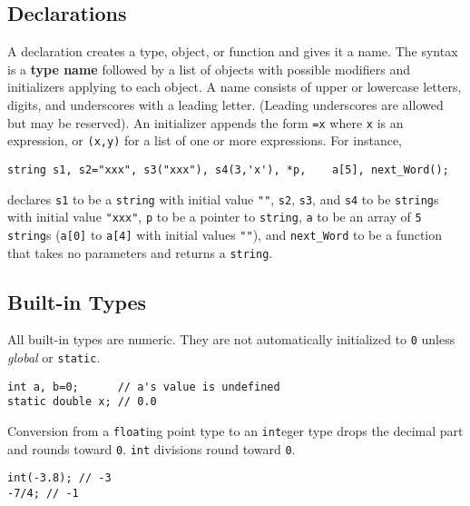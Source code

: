 	
	\subsection{Declarations} %
		A declaration creates a type, object, or function and gives it a name. The syntax is a \textbf{type name} followed by a list of objects with possible modifiers and initializers applying to each object. A name consists of upper or lowercase letters, digits, and underscores with a leading letter. (Leading underscores are allowed but may be reserved). An initializer appends the form \lstinline!=x! where \lstinline!x! is an expression, or \lstinline!(x,y)! for a list of one or more expressions. For instance,
		\begin{code}\begin{lstlisting}[style=list]
string s1, s2="xxx", s3("xxx"), s4(3,'x'), *p,    a[5], next_Word();
		\end{lstlisting}\end{code}
		declares \lstinline!s1! to be a \lstinline!string! with initial value \lstinline!""!, \lstinline!s2!, \lstinline!s3!, and \lstinline!s4! to be \lstinline!string!s with initial value \lstinline!"xxx"!, \lstinline!p! to be a pointer to \lstinline!string!, \lstinline!a! to be an array of \lstinline!5! \lstinline!string!s (\lstinline!a[0]! to \lstinline!a[4]! with initial values \lstinline!""!), and \lstinline!next_Word! to be a function that takes no parameters and returns a \lstinline!string!.
	
	\subsection{Built-in Types} %
		All built-in types are numeric. They are not automatically initialized to \lstinline!0! unless \emph{global} or \lstinline!static!.
		\begin{code}\begin{lstlisting}[style=list]
int a, b=0;      // a's value is undefined
static double x; // 0.0
		\end{lstlisting}\end{code}
		
		Conversion from a \lstinline!float!ing point type to an \lstinline!int!eger type drops the decimal part and rounds toward \lstinline!0!. \lstinline!int! divisions round toward \lstinline!0!.
		\begin{code}\begin{lstlisting}[style=list]
int(-3.8); // -3
-7/4; // -1
		\end{lstlisting}\end{code}
		
